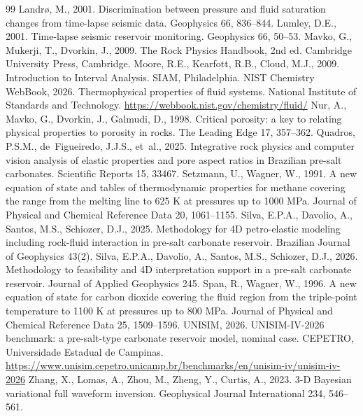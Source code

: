 \documentclass[preprint,11pt,authoryear]{elsarticle}
\begin{document}
\begin{thebibliography}{99}
 Landr\o, M., 2001. Discrimination between pressure and fluid saturation changes from time-lapse seismic data. Geophysics 66, 836--844.
 Lumley, D.E., 2001. Time-lapse seismic reservoir monitoring. Geophysics 66, 50--53.
 Mavko, G., Mukerji, T., Dvorkin, J., 2009. The Rock Physics Handbook, 2nd ed. Cambridge University Press, Cambridge.
 Moore, R.E., Kearfott, R.B., Cloud, M.J., 2009. Introduction to Interval Analysis. SIAM, Philadelphia.
 NIST Chemistry WebBook, 2026. Thermophysical properties of fluid systems. National Institute of Standards and Technology. \url{https://webbook.nist.gov/chemistry/fluid/}
 Nur, A., Mavko, G., Dvorkin, J., Galmudi, D., 1998. Critical porosity: a key to relating physical properties to porosity in rocks. The Leading Edge 17, 357--362.
 Quadros, P.S.M., de~Figueiredo, J.J.S., et~al., 2025. Integrative rock physics and computer vision analysis of elastic properties and pore aspect ratios in Brazilian pre-salt carbonates. Scientific Reports 15, 33467.
 Setzmann, U., Wagner, W., 1991. A new equation of state and tables of thermodynamic properties for methane covering the range from the melting line to 625 K at pressures up to 1000 MPa. Journal of Physical and Chemical Reference Data 20, 1061--1155.
 Silva, E.P.A., Davolio, A., Santos, M.S., Schiozer, D.J., 2025. Methodology for 4D petro-elastic modeling including rock-fluid interaction in pre-salt carbonate reservoir. Brazilian Journal of Geophysics 43(2).
 Silva, E.P.A., Davolio, A., Santos, M.S., Schiozer, D.J., 2026. Methodology to feasibility and 4D interpretation support in a pre-salt carbonate reservoir. Journal of Applied Geophysics 245.
 Span, R., Wagner, W., 1996. A new equation of state for carbon dioxide covering the fluid region from the triple-point temperature to 1100 K at pressures up to 800 MPa. Journal of Physical and Chemical Reference Data 25, 1509--1596.
 UNISIM, 2026. UNISIM-IV-2026 benchmark: a pre-salt-type carbonate reservoir model, nominal case. CEPETRO, Universidade Estadual de Campinas. \url{https://www.unisim.cepetro.unicamp.br/benchmarks/en/unisim-iv/unisim-iv-2026}
 Zhang, X., Lomas, A., Zhou, M., Zheng, Y., Curtis, A., 2023. 3-D Bayesian variational full waveform inversion. Geophysical Journal International 234, 546--561.
\end{thebibliography}
\end{document}

